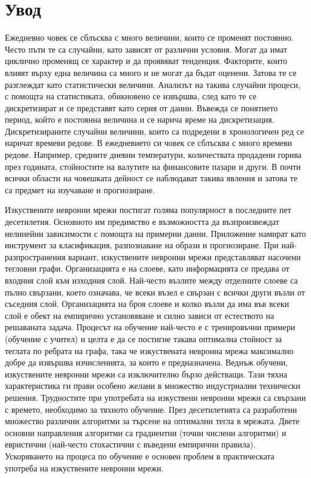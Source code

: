 \chapter*{Увод}

Ежедневно човек се сблъсква с много величини, които се променят постоянно. Често пъти те са случайни, като зависят от различни условия. Могат да имат циклично променящ се характер и да проявяват тенденция. Факторите, които влияят върху една величина са много и не могат да бъдат оценени. Затова те се разглеждат като статистически величини. Анализът на такива случайни процеси, с помощта на статистиката, обикновено се извършва, след като те се дискретизират и се представят като серия от данни. Въвежда се понятието период, който е постоянна величина и се нарича време на дискретизация. Дискретизираните случайни величини, които са подредени в хронологичен ред се наричат времеви редове. В ежедневието си човек се сблъсква с много времеви редове. Например, средните дневни температури, количествата продадени горива през годината, стойностите на валутите на финансовите пазари и други. В почти всички области на човешката дейност се наблюдават такива явления и затова те са предмет на изучаване и прогнозиране.

Изкуствените невронни мрежи постигат голяма популярност в последните пет десетилетия. Основното им предимство е възможността да възпроизвеждат нелинейни зависимости с помощта на примерни данни. Приложение намират като инструмент за класификация, разпознаване на образи и прогнозиране. При най-разпространения вариант, изкуствените невронни мрежи представляват насочени тегловни графи. Организацията е на слоеве, като информацията се предава от входния слой към изходния слой. Най-често възлите между отделните слоеве са пълно свързани, което означава, че всеки възел е свързан с всички други възли от съседния слой. Организацията на броя слоеве и колко възли да има във всеки слой е обект на емпирично установяване и силно зависи от естеството на решаваната задача. Процесът на обучение най-често е с тренировъчни примери (обучение с учител) и целта е да се постигне такава оптимална стойност за теглата по ребрата на графа, така че изкуствената невронна мрежа максимално добре да извършва изчисленията, за които е предназначена. Веднъж обучени, изкуствените невронни мрежи са изключително бързо действащи. Тази тяхна характеристика ги прави особено желани в множество индустриални технически решения. Трудностите при употребата на изкуствени невронни мрежи са свързани с времето, необходимо за тяхното обучение. През десетилетията са разработени множество различни алгоритми за търсене на оптимални тегла в мрежата. Двете основни направления алгоритми са градиентни (точни числени алгоритми) и евристични (най-често стохастични с въведени емпирични правила). Ускоряването на процеса по обучение е основен проблем в практическата употреба на изкуствените невронни мрежи.


